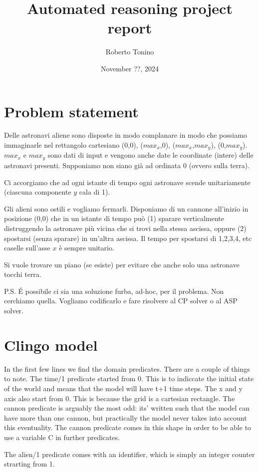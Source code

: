 \documentclass[11pt]{article}
\title{Automated reasoning project report}
\author{Roberto Tonino}
\date{November ??, 2024}
\begin{document}
\maketitle


\section{Problem statement}

Delle astronavi aliene sono disposte in modo complanare in modo che possiamo immaginarle nel rettangolo cartesiano (0,0), ($max_x$,0), ($max_x$,$max_y$), (0,$max_y$).
$max_x$ e $max_y$ sono dati di input e vengono anche date le coordinate (intere) delle astronavi presenti. Supponiamo non siano già ad ordinata 0 (ovvero sulla terra).

Ci accorgiamo che ad ogni istante di tempo ogni astronave scende unitariamente (ciascuna componente $y$ cala di 1).

Gli alieni sono ostili e vogliamo fermarli.
Disponiamo di un cannone all'inizio in posizione (0,0) che in un istante di tempo può (1) sparare verticalmente distruggendo la astronave più vicina che si trovi nella stessa ascissa, oppure (2) spostarsi (senza sparare) in un'altra ascissa.
Il tempo per spostarsi di 1,2,3,4, etc caselle sull'asse $x$ è sempre unitario.

Si vuole trovare un piano (se esiste) per evitare che anche solo una astronave tocchi terra.

P.S. \'E possibile ci sia una soluzione furba, ad-hoc, per il problema.
Non cerchiamo quella.
Vogliamo codificarlo e fare risolvere al CP solver o al ASP solver.

\section{Clingo model}

In the first few lines we find the domain predicates.
There are a couple of things to note.
The time/1 predicate started from 0.
This is to indiccate the initial state of the world and means that the model will have t+1 time steps.
The x and y axis also start from 0.
This is because the grid is a cartesian rectangle.
The cannon predicate is arguably the most odd: its' written such that the model can have more than one cannon, but practically the model never takes into account this eventuality.
The cannon predicate comes in this shape in order to be able to use a variable C in further predicates.

The alien/1 predicate comes with an identifier, which is simply an integer counter strarting from 1.
\end{document}
